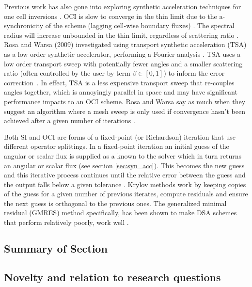 Previous work has also gone into exploring synthetic acceleration techniques for one cell inversions \cite{ kim_coarse_2000}.
OCI is slow to converge in the thin limit due to the a-synchronicity of the scheme (lagging cell-wise boundary fluxes) \cite{hoagland_hybrid_2021}.
The spectral radius will increase unbounded in the thin limit, regardless of scattering ratio \cite{rosa_cellwise_2013}.
Rosa and Warsa (2009) investigated using transport synthetic acceleration (TSA) as a low order synthetic accelerator, performing a Fourier analysis \cite{tsa2009rosa, tsa_slab2006rosa, tsa_2d2007rosa}.
TSA uses a low order transport sweep with potentially fewer angles and a smaller scattering ratio (often controlled by the user by term $\beta \in [0,1]$) to inform the error correction~\cite{tsa1997gilles}.
In effect, TSA is a less expensive transport sweep that re-couples angles together, which is annoyingly parallel in space and may have significant performance impacts to an OCI scheme.
Rosa and Warsa say as much when they suggest an algorithm where a mesh sweep is only used if convergence hasn't been achieved after a given number of iterations \cite{tsa2009rosa}.

Both SI and OCI are forms of a fixed-point (or Richardson) iteration that use different operator splittings.
In a fixed-point iteration an initial guess of the angular or scalar flux is supplied as a known to the solver which in turn returns an angular or scalar flux (see section \ref{sec:syn_acc}).
This becomes the new guess and this iterative process continues until the relative error between the guess and the output falls below a given tolerance \cite{lewis_computational_1984}.
Krylov methods work by keeping copies of the guess for a given number of previous iterates, compute residuals and ensure the next guess is orthogonal to the previous ones\cite{gmres1996kelley, patton_gmres_2002}.
The generalized minimal residual (GMRES) method specifically, has been shown to make DSA schemes that perform relatively poorly, work well \cite{kylov2004warsa, subspace2004warsa}.


\subsection{Summary of Section}




\subsection{Novelty and relation to research questions}


